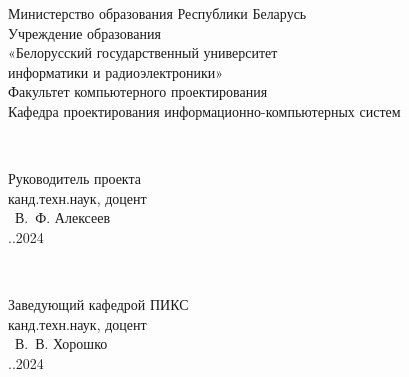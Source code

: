 
\begin{titlepage}
\begin{center}
Министерство образования Республики Беларусь\\
Учреждение образования\\
«Белорусский государственный университет \\
информатики и радиоэлектроники»\\[1.2em]

Факультет компьютерного проектирования\\
Кафедра проектирования информационно-компьютерных систем\\
\end{center}

\vfill

\begin{minipage}{8cm}
  \begin{flushleft}
    \\
    \raggedright %
    Руководитель проекта\\
    канд.техн.наук, доцент\\
    \underline{\hspace*{2cm}} ~В.~Ф. Алексеев\\
    \underline{\hspace*{0.5cm}}.\underline{\hspace*{0.5cm}}.2024\\
  \end{flushleft}
\end{minipage}
\hfill
\begin{minipage}{8cm}
  \begin{flushright}
    \\
    \raggedright
    Заведующий кафедрой ПИКС\\
    канд.техн.наук, доцент\\
    \underline{\hspace*{2cm}} ~В.~В. Хорошко\\
    \underline{\hspace*{0.5cm}}.\underline{\hspace*{0.5cm}}.2024\\
  \end{flushright}
\end{minipage}



\end{titlepage}
